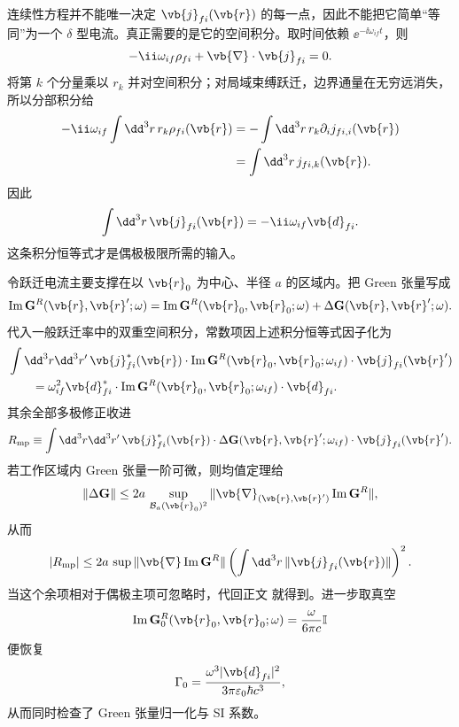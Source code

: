 \begin{derivation}[跃迁电流的偶极极限与衰变率]
连续性方程并不能唯一决定 $\vb{j}_{fi}(\vb{r})$ 的每一点，因此不能把它简单“等同”为一个 $\delta$ 型电流。真正需要的是它的空间积分。取时间依赖 $\ee^{-\ii\omega_{if}t}$，则
\[
-\ii\omega_{if}\rho_{fi}
+\vb{\nabla}\cdot\vb{j}_{fi}=0.
\]
将第 $k$ 个分量乘以 $r_k$ 并对空间积分；对局域束缚跃迁，边界通量在无穷远消失，所以分部积分给
\begin{align*}
-\ii\omega_{if}
\int\dd^3r\,r_k\rho_{fi}(\vb{r})
&=-\int\dd^3r\,r_k\partial_i j_{fi,i}(\vb{r})\\
&=\int\dd^3r\,j_{fi,k}(\vb{r}).
\end{align*}
因此
\[
{
\int\dd^3r\,\vb{j}_{fi}(\vb{r})
=-\ii\omega_{if}\vb{d}_{fi}.}
\]
这条积分恒等式才是偶极极限所需的输入。

令跃迁电流主要支撑在以 $\vb{r}_0$ 为中心、半径 $a$ 的区域内。把 Green 张量写成
\[
\operatorname{Im}\mathbf G^R(\vb{r},\vb{r}';\omega)
=\operatorname{Im}\mathbf G^R(\vb{r}_0,\vb{r}_0;\omega)
+\Delta\mathbf G(\vb{r},\vb{r}';\omega).
\]
代入一般跃迁率中的双重空间积分，常数项因上述积分恒等式因子化为
\begin{align*}
&\int\dd^3r\dd^3r'\,
\vb{j}_{fi}^*(\vb{r})\cdot
\operatorname{Im}\mathbf G^R(\vb{r}_0,\vb{r}_0;\omega_{if})
\cdot\vb{j}_{fi}(\vb{r}')\\
&\qquad=\omega_{if}^2
\vb{d}_{fi}^*\cdot
\operatorname{Im}\mathbf G^R(\vb{r}_0,\vb{r}_0;\omega_{if})
\cdot\vb{d}_{fi}.
\end{align*}
其余全部多极修正收进
\[
R_{\rm mp}
\equiv
\int\dd^3r\dd^3r'\,
\vb{j}_{fi}^*(\vb{r})\cdot
\Delta\mathbf G(\vb{r},\vb{r}';\omega_{if})
\cdot\vb{j}_{fi}(\vb{r}').
\]
若工作区域内 Green 张量一阶可微，则均值定理给
\[
\|\Delta\mathbf G\|
\le
2a\,
\sup_{\mathcal B_a(\vb{r}_0)^2}
\|\vb{\nabla}_{(\vb{r},\vb{r}')}\operatorname{Im}\mathbf G^R\|,
\]
从而
\[
|R_{\rm mp}|
\le
2a\,
\sup\|\vb{\nabla}\operatorname{Im}\mathbf G^R\|
\left(\int\dd^3r\,\|\vb{j}_{fi}(\vb{r})\|\right)^2.
\]
当这个余项相对于偶极主项可忽略时，代回正文 就得到。进一步取真空
\[
\operatorname{Im}\mathbf G_0^R(\vb{r}_0,\vb{r}_0;\omega)
=\frac{\omega}{6\pi c}\mathbb I
\]
便恢复
\[
\Gamma_0
=\frac{\omega^3|\vb{d}_{fi}|^2}{3\pi\varepsilon_0\hbar c^3},
\]
从而同时检查了 Green 张量归一化与 SI 系数。
\end{derivation}

